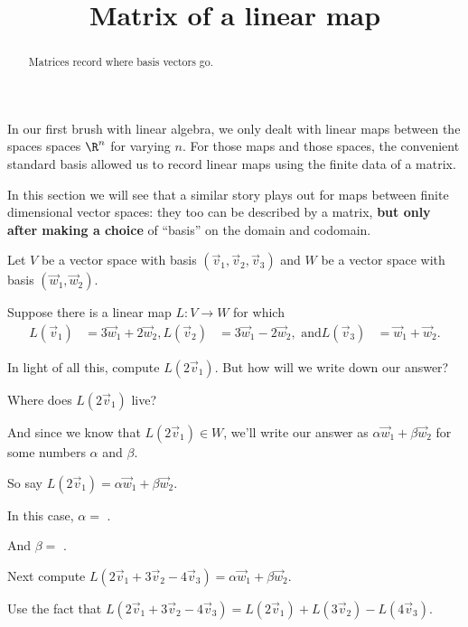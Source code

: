 \documentclass{ximera}
\title{Matrix of a linear map}
\begin{document}
\begin{abstract}
  Matrices record where basis vectors go.
\end{abstract}

In our first brush with linear algebra, we only dealt with linear maps
between the spaces spaces $\R^n$ for varying $n$.  For those maps and
those spaces, the convenient standard basis allowed us to record
linear maps using the finite data of a matrix.

In this section we will see that a similar story plays out for maps
between finite dimensional vector spaces: they too can be described by
a matrix, \textbf{but only after making a choice} of ``basis'' on the
domain and codomain.

\begin{question}
  Let $V$ be a vector space with basis $(\vec{v}_1,\vec{v}_2,\vec{v}_3)$ and $W$ be a vector space with basis $(\vec{w}_1,\vec{w}_2)$.

  Suppose there is a linear map $L: V \to W$ for which
  \begin{align*}
    L(\vec{v}_1) &= 3\vec{w}_1 + 2\vec{w}_2,
    L(\vec{v}_2) &= 3\vec{w}_1 - 2\vec{w}_2, \text{ and}
    L(\vec{v}_3) &= \vec{w}_1 + \vec{w}_2.
    \end{align*}
    
    In light of all this, compute $L(2\vec{v}_1)$.  But how will we write down our answer?

    Where does $L(2\vec{v}_1)$ live?
    \begin{solution}
      \begin{multiple-choice}
      \end{multiple-choice}
    \end{solution}

    And since we know that $L(2\vec{v}_1) \in W$, we'll write our
    answer as $\alpha \vec{w}_1 + \beta \vec{w}_2$ for some numbers
    $\alpha$ and $\beta$.

    So say $L(2\vec{v}_1) = \alpha \vec{w}_1 + \beta \vec{w}_2$.  

    \begin{solution}
      In this case, $\alpha = $ .
    \end{solution}

    \begin{solution}
      And $\beta = $ .
    \end{solution}

    Next compute $L(2\vec{v}_1+3\vec{v}_2-4\vec{v}_3) = \alpha \vec{w}_1 + \beta \vec{w}_2$.
    \begin{solution}
      \begin{hint}
        Use the fact that $L(2\vec{v}_1+3\vec{v}_2-4\vec{v}_3) = L(2\vec{v}_1)+L(3\vec{v}_2)-L(4\vec{v}_3)$.
      \end{hint}


\end{solution}
\end{question}
\end{document}
